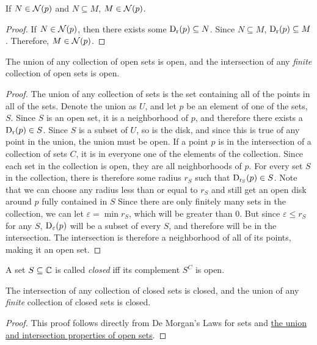 \begin{lemma}
If $N \in \nbhd{p}$ and $N \subseteq M$, $M \in \nbhd{p}$.
\end{lemma}
\begin{proof}
If $N \in \nbhd{p}$, then there exists some $\disk{p}{r} \subseteq N$. Since $N \subseteq M$, $\disk{p}{r} \subseteq M$. Therefore, $M \in \nbhd{p}$.
\end{proof}
\begin{lemma}
The union of any collection of open sets is open, and the intersection of any \emph{finite} collection of open sets is open.
\end{lemma}
\begin{proof}
The union of any collection of sets is the set containing all of the points in all of the sets. Denote the union as $U$, and let $p$ be an element of one of the sets, $S$. Since $S$ is an open set, it is a neighborhood of $p$, and therefore there exists a $\disk{p}{r} \in S$.
Since $S$ is a subset of $U$, so is the disk, and since this is true of any point in the union, the union must be open.
If a point $p$ is in the intersection of a collection of sets $C$, it is in everyone one of the elements of the collection. Since each set in the collection is open, they are all neighborhoods of $p$. For every set $S$ in the collection, there is therefore some radius $r_S$ such that $\disk{p}{r_S} \in S$. Note that we can choose any radius less than or equal to $r_S$ and still get an open disk around $p$ fully contained in $S$
Since there are only finitely many sets in the collection, we can let $\varepsilon = \min r_S$, which will be greater than $0$. But since $\varepsilon \leq r_S$ for any $S$, $\disk{p}{\varepsilon}$ will be a subset of every $S$, and therefore will be in the intersection. The intersection is therefore a neighborhood of all of its points, making it an open set. 
\end{proof}
\begin{definition}
A set $S \subseteq \C$ is called \emph{closed} iff its complement $S^C$ is open.
\end{definition}
\begin{lemma}
The intersection of any collection of closed sets is closed, and the union of any \emph{finite} collection of closed sets is closed.
\end{lemma}
\begin{proof}
This proof follows directly from De Morgan's Laws for sets and \hyperlink{Properties of Open Sets}{the union and intersection properties of open sets}.
\end{proof}
